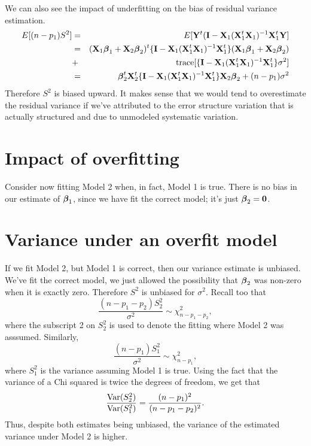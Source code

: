 We can also see the  impact of underfitting on the bias of residual variance estimation.
\begin{eqnarray*}
E[(n- p_1) S^2] & = & E[\mathbf{Y}^t (\mathbf{I} -  \mathbf{X}_1 (\mathbf{X}_1^t \mathbf{X}_1)^{-1} \mathbf{X}_1^t \mathbf{Y}] \\
& = &(\mathbf{X}_1\boldsymbol{\beta}_1 + \mathbf{X}_2 \boldsymbol{\beta}_2)^t\{\mathbf{I} -  \mathbf{X}_1 (\mathbf{X}_1^t \mathbf{X}_1)^{-1} \mathbf{X}_1^t\} (\mathbf{X}_1\boldsymbol{\beta}_1 + \mathbf{X}_2 \boldsymbol{\beta}_2) \\
& + & \mathrm{trace}[\{\mathbf{I} -  \mathbf{X}_1 (\mathbf{X}_1^t \mathbf{X}_1)^{-1} \mathbf{X}_1^t \} \sigma^2] \\
& = & \boldsymbol{\beta}_2^t \mathbf{X}_2^t \{\mathbf{I} -  \mathbf{X}_1 (\mathbf{X}_1^t \mathbf{X}_1)^{-1} \mathbf{X}_1^t\} \mathbf{X}_2 \boldsymbol{\beta}_2 + (n - p_1) \sigma^2
\end{eqnarray*}
Therefore $S^2$ is biased upward. It makes sense that we would tend to overestimate the residual
variance if we've attributed to the error structure variation that is actually structured and
due to unmodeled systematic variation.

\section{Impact of overfitting}
Consider now fitting Model 2 when, in fact, Model 1 is true. There
is no bias in our estimate of $\boldsymbol{\beta}_1$, since we have fit the correct model;
it's just $\boldsymbol{\beta}_2 = \mathbf{0}$.  

\section{Variance under an overfit model}
If we fit Model 2, but Model 1 is correct, then our variance estimate is 
unbiased. We've fit the correct model, we just allowed the possibility that
$\boldsymbol{\beta}_2$ was non-zero when it is exactly zero. Therefore $S^2$ is unbiased
for $\sigma^2$. Recall too that
$$
\frac{(n-p_1 - p_2)S^2_2}{\sigma^2} \sim \chi^2_{n-p_1 - p_2},
$$
where the subscript 2 on $S^2_2$ is used to denote the fitting where Model 2 was asssumed.
Similarly,
$$
 \frac{(n-p_1)S^2_1}{\sigma^2} \sim \chi^2_{n-p_1},
$$
where $S_1^2$ is the variance assuming Model 1 is true. Using the fact that the variance
of a Chi squared is twice the degrees of freedom, we get that
$$
\frac{\mbox{Var}(S_2^2)}{\mbox{Var}(S_1^2)} = \frac{(n - p_1)^2}{(n - p_1 - p_2)^2}.
$$
Thus, despite both estimates being unbiased, the variance of the estimated variance
under Model 2 is higher.

